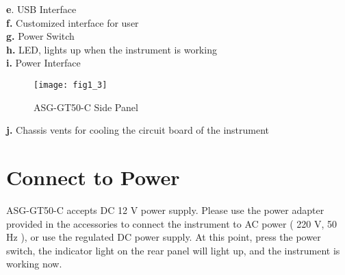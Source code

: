 \noindent \textbf{e}. USB Interface\\
\textbf{f.} Customized interface for user  \\
\textbf{g.} Power Switch\\
\textbf{h.} LED, lights up when the instrument is working\\
\textbf{i.} Power Interface

\begin{figure}[ht]
\centering
\texttt{[image: fig1\_3]}
\caption{\hspace{0.2cm}ASG-GT50-C Side Panel}\label{fig:fig1_3}
\end{figure}
\noindent \textbf{j.} Chassis vents for cooling the circuit board of the instrument

\section{\heiti Connect to Power}
\hspace{-0.2cm}ASG-GT50-C accepts DC 12 V power supply. Please use the power adapter provided in the accessories to connect the instrument to AC power ( 220 V, 50 Hz ), or use the regulated DC power supply. At this point, press the power switch, the indicator light on the rear panel will light up, and the instrument is working now.

